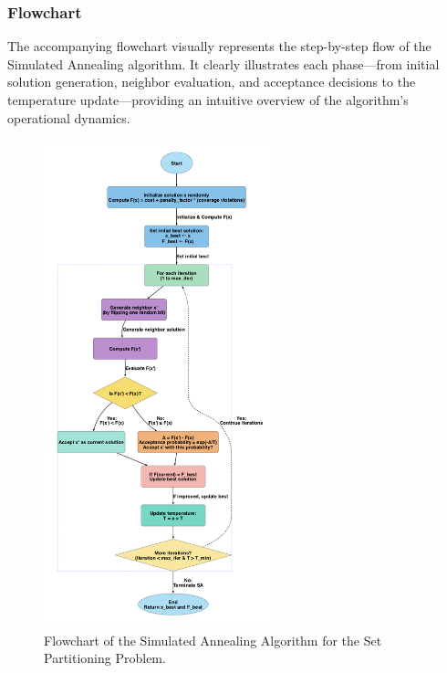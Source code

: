 \documentclass[12pt]{article}
\begin{document}
\subsubsection{Flowchart}
The accompanying flowchart visually represents the step-by-step flow of the Simulated Annealing algorithm. It clearly illustrates each phase—from initial solution generation, neighbor evaluation, and acceptance decisions to the temperature update—providing an intuitive overview of the algorithm’s operational dynamics.

\begin{figure}[htbp]
  \centering
  \includegraphics[width=0.60\textwidth]{simulated_annealing_flowchart.png}
  \caption{Flowchart of the Simulated Annealing Algorithm for the Set Partitioning Problem.}
  \label{fig:flowchart1}
\end{figure}

\newpage
\end{document}

